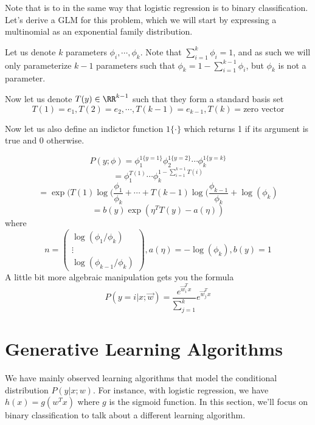 \documentclass[12pt]{scrartcl}
\begin{document}
\begin{definition}
Note that  is to  in the same way that logistic regression is to binary classification. Let's derive a GLM for this problem, which we will start by expressing a multinomial as an exponential family distribution.
    
\end{definition}

Let us denote $k$ parameters $\phi_i, \cdots, \phi_k$. Note that $\sum_{i=1}^k \phi_i = 1$, and as such we will only parameterize $k-1$ parameters such that $\phi_k = 1 - \sum_{i=1}^{k-1}\phi_i$, but $\phi_k$ is not a parameter.

Now let us denote $T(y) \in \RR^{k-1}$ such that they form a standard basis set
\[T(1) = e_1, T(2) = e_2, \cdots ,T(k-1) = e_{k-1}, T(k) = \text{zero vector}\]

Now let us also define an indictor function $1\{\cdot\}$ which returns 1 if its argument is true and 0 otherwise.

\[P(y; \phi) = \phi_1^{1\{y=1\}}\phi_2^{1\{y=2\}}\cdots\phi_k^{1\{y=k\}}\]
\[= \phi_1^{T(1)}\cdots\phi_k^{1-\sum_{i=1}^{k=1}T(i)}\]
\[= \exp(T(1)\log(\frac{\phi_1}{\phi_k} + \cdots + T(k-1)\log(\frac{\phi_{k-1}}{\phi_k} + \log(\phi_k)\]
\[= b(y)\exp(\eta^TT(y) - a(\eta))\]
where 
\[n = \begin{pmatrix}
    \log(\phi_1/\phi_k)\\
    \vdots\\
    \log(\phi_{k-1}/\phi_k)
\end{pmatrix}, a(\eta) = -\log(\phi_k), b(y) = 1\]
A little bit more algebraic manipulation gets you the formula
\[P(y=i| x;\vec{w}) = \frac{e^{\vec{w}_i^Tx}}{\sum_{j=1}^k}e^{\vec{w}_j^Tx}\]

\section{Generative Learning Algorithms}

We have mainly observed learning algorithms that model the conditional distribution $P(y | x; w)$. For instance, with logistic regression, we have $h(x) = g(w^Tx)$ where $g$ is the sigmoid function. In this section, we'll focus on binary classification to talk about a different learning algorithm.\\
\end{document}
